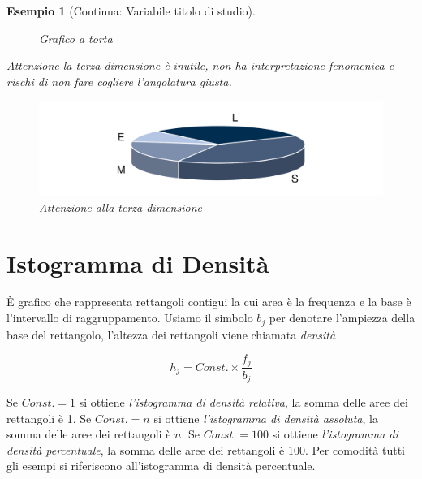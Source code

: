 \documentclass[
  11pt,
]{book}
\theoremstyle{mytheoremstyle}
\theoremstyle{mydefstyle}
\newtheorem{example}{{Esempio}}[section]
\newenvironment{att}
  {
\begin{tcolorbox}[enhanced,arc=0.1mm,boxrule=1pt,colback=white,colframe=ared,title=\bf\small \fontfamily{lmss}\selectfont \faExclamationTriangle \hspace{.5 cm} Attenzione,drop fuzzy shadow]
}{
\end{tcolorbox}
  }
\begin{document}
\begin{example}[Continua: Variabile titolo di studio]
\begin{figure}[H]
{}

\caption{Grafico a torta}\label{fig:unnamed-chunk-8}
\end{figure}

\begin{att}

Attenzione la terza dimensione è inutile, non ha interpretazione fenomenica e
rischi di non fare cogliere l'angolatura giusta.

\begin{figure}[H]

\includegraphics[width=18.31in,]{img/grafico_torta_3d_margin} \hfill{}

\caption{Attenzione alla terza dimensione}\label{fig:unnamed-chunk-9}
\end{figure}

\end{att}

\end{example}

\section{Istogramma di Densità}\label{istogramma-di-densituxe0}

È grafico che rappresenta rettangoli contigui la cui area è la frequenza e la base è l'intervallo di raggruppamento. Usiamo il simbolo \(b_j\) per denotare l'ampiezza della base del rettangolo, l'altezza dei rettangoli viene chiamata \emph{densità}

\begin{info}
\[h_j = Const.\times \frac {f_j} {b_j}\]

\end{info}

Se \(Const.=1\) si ottiene \emph{l'istogramma di densità relativa}, la somma delle aree dei rettangoli è 1. Se \(Const.=n\) si ottiene \emph{l'istogramma di densità assoluta}, la somma delle aree dei rettangoli è \(n\). Se \(Const.=100\) si ottiene \emph{l'istogramma di densità percentuale}, la somma delle aree dei rettangoli è 100. Per comodità tutti gli esempi si riferiscono all'istogramma di densità percentuale.
\end{document}
